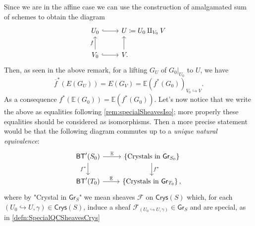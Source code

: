 \begin{rem}
	Since we are in the affine case we can use the construction of amalgamated
	sum of schemes to obtain the diagram
	\begin{equation*}
	\begin{tikzcd}[/tikz/column 2/.append style={anchor=base west}]
		U_0 \arrow[r, "", hookrightarrow] &
		U \coloneqq U_0 \amalg_{V_0} V \\
		V_0 \arrow[u, "f", rightarrow] 
		\arrow[r, "", hookrightarrow] &
		V \arrow[u, "", rightarrow, end anchor={[xshift=1.84ex,yshift=0.29ex]south west},
		start anchor={[xshift=0.38ex]}] 
	.\end{tikzcd}
	\end{equation*}
	Then, as seen in the above remark, for a lifting $G_U$ 
	of $\left.G_0\right|_{U_0}$ to $U$, we have
	\begin{equation*}
		\overline{f}^* \left( E(G_U) \right) =
		E(G_V) = \mathbb{E} \left( f^* (G_0) \right)_{V_0 \hookrightarrow V}
	.\end{equation*}
	As a consequence $f^* \left( \mathbb{E}(G_0) \right) =
	\mathbb{E}\left( f^*(G_0) \right)$.
	Let's now notice that we write the above as equalities following \cref{rem:specialSheavesIso};
	more properly these equalities should be considered as isomorphisms.
	Then a more precise statement would be that the following diagram
	commutes up to a {\em unique natural equivalence}:
	\begin{equation*}
	\begin{tikzcd}
		\mathsf{BT}'(S_0)
		\arrow[r, "\mathbb{E}", rightarrow] 
		\arrow[d, "f^*"', rightarrow] &
		\left\{ \text{Crystals in } \mathsf{Gr}_{S_0} \right\}
		\arrow[d, "f^*", rightarrow] \\
		\mathsf{BT}'(T_0) \arrow[r, "\mathbb{E}", rightarrow] &
		\left\{ \text{Crystals in } \mathsf{Gr}_{T_0} \right\}
	,\end{tikzcd}
	\end{equation*}
	where by "Crystal in $\mathsf{Gr}_S$" we mean sheaves $\mathscr{F}$ on $\mathsf{Crys}(S)$
	which, for each $\left(U_0 \hookrightarrow U, \gamma\right) \in \mathsf{Crys}(S)$,
	induce a sheaf $\mathscr{F}_{\left(U_0 \hookrightarrow U, \gamma\right)} \in \mathsf{Gr}_S$
	and are special, as in \cref{defn:SpecialQCSheavesCrys}
\end{rem}


